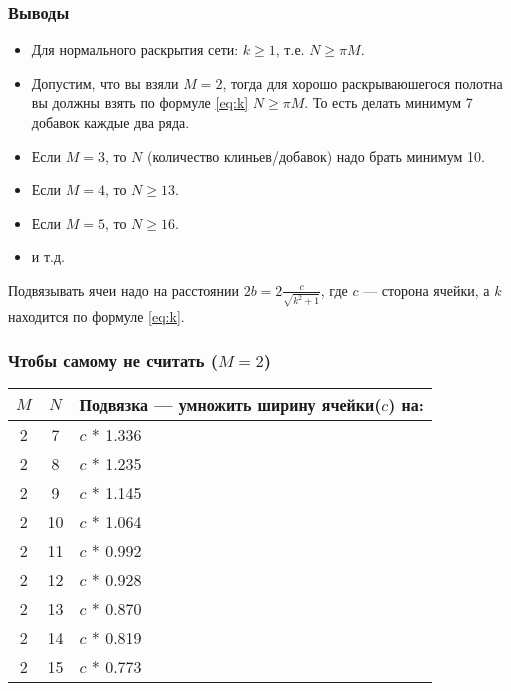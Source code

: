 \begin{frame}
    \frametitle{Выводы}

	\begin{itemize}
		\item Для нормального раскрытия сети: $k\geq 1$, т.е. $N\geq \pi M$.
		\item Допустим, что вы взяли $M=2$, тогда для хорошо раскрываюшегося полотна вы должны взять по формуле \eqref{eq:k} $N\geq \pi M$. То есть делать минимум 7 добавок каждые два ряда.
		\item Если $M=3$, то $N$ (количество клиньев/добавок) надо брать минимум 10.
		\item Если $M=4$, то $N\geq 13$.
		\item Если $M=5$, то $N\geq 16$.
		\item и т.д.
	\end{itemize}
	
	Подвязывать ячеи надо на расстоянии $2b=2\frac{c}{\sqrt{k^2+1}}$, где $c$ --- сторона ячейки, а $k$ находится по формуле \eqref{eq:k}.
\end{frame}

\begin{frame}
    \frametitle{Чтобы самому не считать ($M=2$)}

	\begin{center}	
		\begin{tabular}{c|c|l}
			\hline\hline
			$M$ & $N$ &Подвязка --- умножить ширину ячейки($c$) на: \\ 
			\hline\hline
			2 & 7	& $c$ * 1.336 \\
			2 & 8	& $c$ * 1.235 \\
			2 & 9	& $c$ * 1.145 \\
			2 & 10	& $c$ * 1.064 \\
			2 & 11	& $c$ * 0.992 \\
			2 & 12	& $c$ * 0.928 \\
			2 & 13	& $c$ * 0.870 \\
			2 & 14	& $c$ * 0.819 \\
			2 & 15	& $c$ * 0.773 \\
			\hline		
		\end{tabular}
	\end{center}	
\end{frame}

